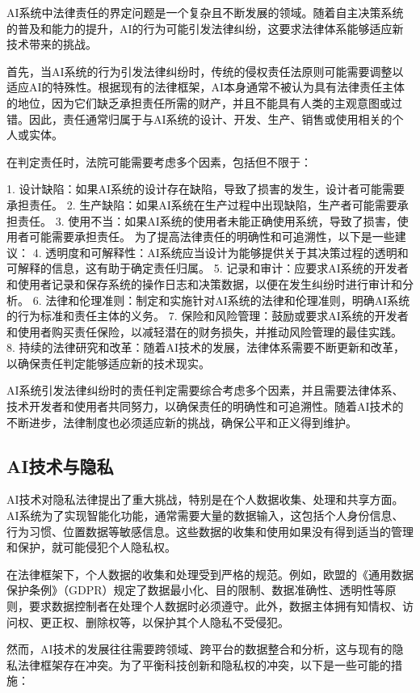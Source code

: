AI系统中法律责任的界定问题是一个复杂且不断发展的领域。随着自主决策系统的普及和能力的提升，AI的行为可能引发法律纠纷，这要求法律体系能够适应新技术带来的挑战。

首先，当AI系统的行为引发法律纠纷时，传统的侵权责任法原则可能需要调整以适应AI的特殊性。根据现有的法律框架，AI本身通常不被认为具有法律责任主体的地位，因为它们缺乏承担责任所需的财产，并且不能具有人类的主观意图或过错。因此，责任通常归属于与AI系统的设计、开发、生产、销售或使用相关的个人或实体。

在判定责任时，法院可能需要考虑多个因素，包括但不限于：

1. 设计缺陷：如果AI系统的设计存在缺陷，导致了损害的发生，设计者可能需要承担责任。
2. 生产缺陷：如果AI系统在生产过程中出现缺陷，生产者可能需要承担责任。
3. 使用不当：如果AI系统的使用者未能正确使用系统，导致了损害，使用者可能需要承担责任。
为了提高法律责任的明确性和可追溯性，以下是一些建议：
4. 透明度和可解释性：AI系统应当设计为能够提供关于其决策过程的透明和可解释的信息，这有助于确定责任归属。
5. 记录和审计：应要求AI系统的开发者和使用者记录和保存系统的操作日志和决策数据，以便在发生纠纷时进行审计和分析。
6. 法律和伦理准则：制定和实施针对AI系统的法律和伦理准则，明确AI系统的行为标准和责任主体的义务。
7. 保险和风险管理：鼓励或要求AI系统的开发者和使用者购买责任保险，以减轻潜在的财务损失，并推动风险管理的最佳实践。
8. 持续的法律研究和改革：随着AI技术的发展，法律体系需要不断更新和改革，以确保责任判定能够适应新的技术现实。

AI系统引发法律纠纷时的责任判定需要综合考虑多个因素，并且需要法律体系、技术开发者和使用者共同努力，以确保责任的明确性和可追溯性。随着AI技术的不断进步，法律制度也必须适应新的挑战，确保公平和正义得到维护。

\subsection{AI技术与隐私}

AI技术对隐私法律提出了重大挑战，特别是在个人数据收集、处理和共享方面。AI系统为了实现智能化功能，通常需要大量的数据输入，这包括个人身份信息、行为习惯、位置数据等敏感信息。这些数据的收集和使用如果没有得到适当的管理和保护，就可能侵犯个人隐私权。

在法律框架下，个人数据的收集和处理受到严格的规范。例如，欧盟的《通用数据保护条例》（GDPR）规定了数据最小化、目的限制、数据准确性、透明性等原则，要求数据控制者在处理个人数据时必须遵守。此外，数据主体拥有知情权、访问权、更正权、删除权等，以保护其个人隐私不受侵犯。

然而，AI技术的发展往往需要跨领域、跨平台的数据整合和分析，这与现有的隐私法律框架存在冲突。为了平衡科技创新和隐私权的冲突，以下是一些可能的措施：

